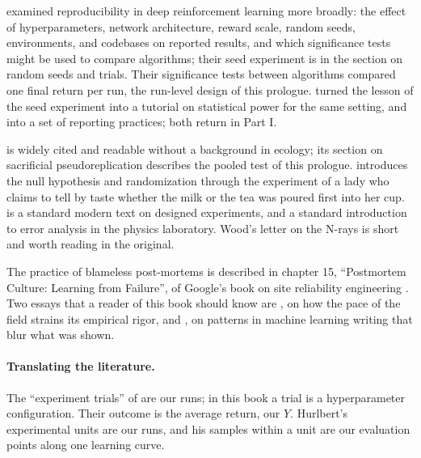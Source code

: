 \begin{refsection}
\notesandrefs

\Textcite{HendersonEtAl2018} examined reproducibility in deep reinforcement learning more broadly: the effect of hyperparameters, network architecture, reward scale, random seeds, environments, and codebases on reported results, and which significance tests might be used to compare algorithms; their seed experiment is in the section on random seeds and trials. Their significance tests between algorithms compared one final return per run, the run-level design of this prologue. \Textcite{ColasSigaudOudeyer2018} turned the lesson of the seed experiment into a tutorial on statistical power for the same setting, and \textcite{AgarwalEtAl2021} into a set of reporting practices; both return in Part I.

\Textcite{Hurlbert1984} is widely cited and readable without a background in ecology; its section on sacrificial pseudoreplication describes the pooled test of this prologue. \Textcite{Fisher1935} introduces the null hypothesis and randomization through the experiment of a lady who claims to tell by taste whether the milk or the tea was poured first into her cup. \Textcite{BoxHunterHunter2005} is a standard modern text on designed experiments, and \textcite{Taylor1997} a standard introduction to error analysis in the physics laboratory. Wood's letter on the N-rays \parencite{Wood1904} is short and worth reading in the original.

The practice of blameless post-mortems is described in chapter 15, ``Postmortem Culture: Learning from Failure'', of Google's book on site reliability engineering \parencite{BeyerEtAl2016}. Two essays that a reader of this book should know are \textcite{SculleyEtAl2018}, on how the pace of the field strains its empirical rigor, and \textcite{LiptonSteinhardt2019}, on patterns in machine learning writing that blur what was shown.

\paragraph{Translating the literature.} The ``experiment trials'' of \textcite{HendersonEtAl2018} are our runs; in this book a trial is a hyperparameter configuration. Their outcome is the average return, our $Y$. Hurlbert's experimental units are our runs, and his samples within a unit are our evaluation points along one learning curve.

\printchapterbib
\end{refsection}
\labfloatrestore
